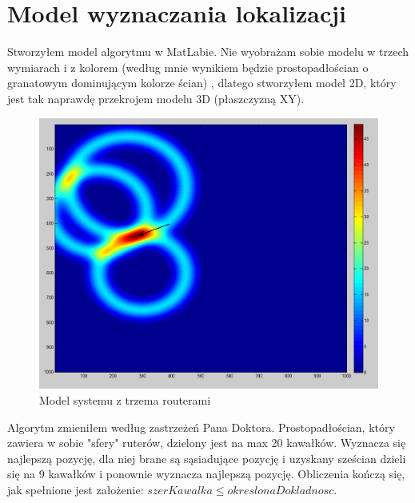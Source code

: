 \documentclass{article}
\begin{document}
\section{Model wyznaczania lokalizacji}
	Stworzyłem model algorytmu w MatLabie. Nie wyobrażam sobie modelu w trzech wymiarach i z kolorem (według mnie wynikiem będzie prostopadłościan o granatowym dominującym kolorze ścian) , dlatego stworzyłem model 2D, który jest tak naprawdę przekrojem modelu 3D (płaszczyzną XY).
	\begin{figure}	
		\centering			
		\caption{Model systemu z trzema routerami}
		\includegraphics[width=\textwidth]{guasianRouter}
	\end{figure}
	Algorytm zmieniłem według zastrzeżeń Pana Doktora. Prostopadłościan, który zawiera w sobie "sfery" ruterów, dzielony jest na max 20 kawałków. Wyznacza się najlepszą pozycję, dla niej brane są sąsiadujące pozycję i uzyskany sześcian dzieli się na 9 kawałków i ponownie wyznacza najlepszą pozycję. Obliczenia kończą się, jak spełnione jest założenie: $szerKawalka \leqslant okreslonaDokladnosc$.	  
\end{document}
